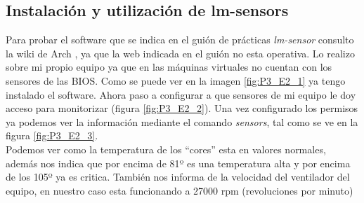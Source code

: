 \subsection{Instalación y utilización de lm-sensors}
Para probar el software que se indica en el guión de prácticas \textit{lm-sensor} consulto 
la wiki de Arch \cite{lmSensor}, ya que la web indicada en el guión no esta operativa.
Lo realizo sobre mi propio equipo ya que en las máquinas virtuales no cuentan con los sensores de
las BIOS.
Como se puede ver en la imagen \ref{fig:P3_E2_1} ya tengo instalado el software. Ahora paso a 
configurar a que sensores de mi equipo le doy acceso para monitorizar (figura \ref{fig:P3_E2_2}).
Una vez configurado los permisos ya podemos ver la información mediante el comando \textit{sensors},
tal como se ve en la figura \ref{fig:P3_E2_3}.\\

Podemos ver como la temperatura de los ``cores'' esta en valores normales, además nos indica que por
encima de 81º es una temperatura alta y por encima de los 105º ya es critica. También nos informa de la
velocidad del ventilador del equipo, en nuestro caso esta funcionando a 27000 rpm (revoluciones por minuto)










